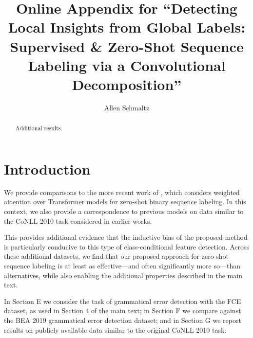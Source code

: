 \documentclass{clv3}
\renewcommand\appendix{%
   \setcounter{section}{4}
   \renewcommand{\theequation}{\Alph{section}.\arabic{equation}}
   \renewcommand{\thetable}{\Alph{section}.\arabic{table}}
   \renewcommand{\thesubsection}{\Alph{section}.\arabic{subsection}}   
}
\begin{document}
\title{Online Appendix for ``Detecting Local Insights from Global Labels: Supervised \& Zero-Shot Sequence Labeling via a Convolutional Decomposition''}

\author{Allen Schmaltz}

\maketitle

\begin{abstract} 
Additional results.
\end{abstract}


\section{Introduction}

We provide comparisons to the more recent work of \citet{BujelEtAl-2021-Zeroshot-Weighted-Attention}, which considers weighted attention over Transformer models for zero-shot binary sequence labeling. In this context, we also provide a correspondence to previous models on data similar to the CoNLL 2010 task considered in earlier works.

This provides additional evidence that the inductive bias of the proposed method is particularly conducive to this type of class-conditional feature detection. Across these additional datasets, we find that our proposed approach for zero-shot sequence labeling is at least as effective---and often significantly more so---than alternatives, while also enabling the additional properties described in the main text. 

In Section E we consider the task of grammatical error detection with the FCE dataset, as used in Section 4 of the main text; in Section F we compare against the BEA 2019 grammatical error detection dataset; and in Section G we report results on publicly available data similar to the original CoNLL 2010 task.

\appendix
\end{document}
